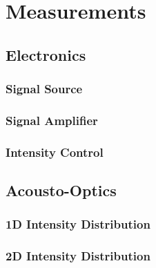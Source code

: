 \chapter{Measurements}


\section{Electronics}

\subsection{Signal Source}

\subsection{Signal Amplifier}


\subsection{Intensity Control}


\section{Acousto-Optics}

\subsection{1D Intensity Distribution}




\subsection{2D Intensity Distribution}

